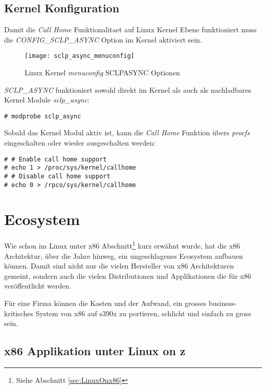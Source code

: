 \subsection{Kernel Konfiguration}

Damit die \textit{Call Home} Funktionalitaet auf Linux Kernel Ebene funktioniert muss die \textit{CONFIG\_SCLP\_ASYNC} Option im Kernel aktiviert sein.

\begin{figure}[h!]
\centering
\texttt{[image: sclp\_async\_menuconfig]}
\caption{Linux Kernel \textit{menuconfig} SCLP\textunderscore ASYNC Optionen}
\label{fig:SCLPASYNC}
\end{figure}

\textit{SCLP\_ASYNC} funktioniert sowohl direkt im Kernel als auch als nachladbares Kernel Module \textit{sclp\_async}:

\begin{lstlisting}
# modprobe sclp_async
\end{lstlisting}

Sobald das Kernel Modul aktiv ist, kann die \textit{Call Home} Funktion übers \textit{procfs} eingeschalten oder wieder ausgeschalten werden:\cite{IBMCallHome}

\begin{lstlisting}
# # Enable call home support
# echo 1 > /proc/sys/kernel/callhome
# # Disable call home support
# echo 0 > /rpco/sys/kernel/callhome
\end{lstlisting}

\section{Ecosystem}

Wie schon im Linux unter x86 Abschnitt\footnote{Siehe Abschnitt \ref{sec:LinuxOnx86}} kurz erwähnt wurde, hat die x86 Architektur, über die Jahre hinweg, ein ungeschlagenes Ecosystem aufbauen können.
Damit sind nicht nur die vielen Hersteller von x86 Architekturen gemeint, sondern auch die vielen Distributionen und Applikationen die für x86 veröffentlicht werden.\cite{x86Manufacturer}

Für eine Firma können die Kosten und der Aufwand, ein grosses business-kritisches System von x86 auf s390x zu portieren, schlicht und einfach zu gross sein.

\subsection{x86 Applikation unter Linux on z}

